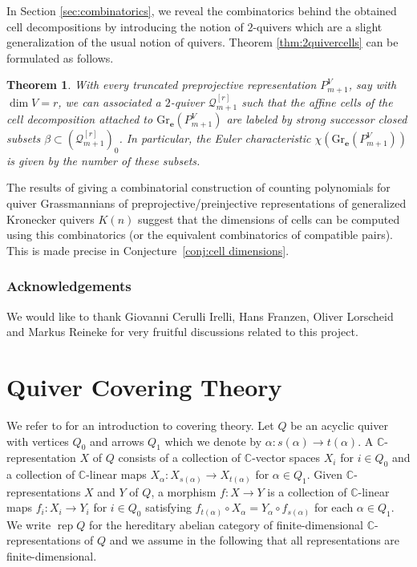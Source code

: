 \documentclass{amsart}
\newcommand{\sayT}[1]{\say[T]{#1}}
\newtheorem{thm}{Theorem}
\numberwithin{equation}{section}
\newcommand{\C}{\mathbb{C}}
\newcommand{\CC}{\mathbb{C}}
\newcommand{\bfe}{\mathbf{e}}
\newcommand{\Gr}{\mathrm{Gr}}
\newcommand{\rep}{\operatorname{rep}}
\begin{document}
In Section \ref{sec:combinatorics}, we reveal the combinatorics behind the obtained cell decompositions by introducing the notion of $2$-quivers which are a slight generalization of the usual notion of quivers.
Theorem \ref{thm:2quivercells} can be formulated as follows.
\begin{thm}
  With every truncated preprojective representation $P_{m+1}^V$, say with $\dim V=r$, we can associated a $2$-quiver $\mathcal Q_{m+1}^{[r]}$ such that the affine cells of the cell decomposition attached to $\Gr_\bfe(P_{m+1}^V)$ are labeled by strong successor closed subsets $\beta\subset (\mathcal Q_{m+1}^{[r]})_0$.
  In particular, the Euler characteristic $\chi(\Gr_\bfe(P_{m+1}^V))$ is given by the number of these subsets.
\end{thm}

The results of \cite{rupel} giving a combinatorial construction of counting polynomials for quiver Grassmannians of preprojective/preinjective representations of generalized Kronecker quivers $K(n)$ suggest that the dimensions of cells can be computed using this combinatorics (or the equivalent combinatorics of compatible pairs).
This is made precise in Conjecture~\ref{conj:cell dimensions}.
\subsubsection*{Acknowledgements}We would like to thank Giovanni Cerulli Irelli, Hans Franzen, Oliver Lorscheid and Markus Reineke for very fruitful discussions related to this project.
\section{Quiver Covering Theory}
\label{sec:covering}
\noindent
We refer to \cite{gab} for an introduction to covering theory.
Let $Q$ be an acyclic quiver with vertices $Q_0$ and arrows $Q_1$ which we denote by $\alpha:s(\alpha)\to t(\alpha)$.
A $\CC$-representation $X$ of $Q$ consists of a collection of $\CC$-vector spaces $X_i$ for $i\in Q_0$ and a collection of $\CC$-linear maps $X_\alpha:X_{s(\alpha)}\to X_{t(\alpha)}$ for $\alpha\in Q_1$.
Given $\CC$-representations $X$ and $Y$ of $Q$, a morphism $f:X\to Y$ is a collection of $\CC$-linear maps $f_i:X_i\to Y_i$ for $i\in Q_0$ satisfying $f_{t(\alpha)}\circ X_\alpha=Y_\alpha\circ f_{s(\alpha)}$ for each $\alpha\in Q_1$.
We write $\rep Q$ for the hereditary abelian category of finite-dimensional $\C$-representations of $Q$ and we assume in the following that all representations are finite-dimensional.
\end{document}
